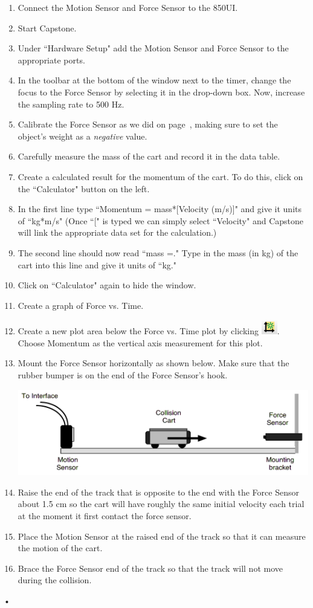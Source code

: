 \documentclass[main.tex]{subfiles}
\begin{document}
\begin{enumerate}
\item
Connect the Motion Sensor and Force Sensor to the 850UI.
\item
Start Capstone.
\item
Under ``Hardware Setup" add the Motion Sensor and Force Sensor to the appropriate ports.
\item
In the toolbar at the bottom of the window next to the timer, change the focus to the Force Sensor by selecting it in the drop-down box. Now, increase the sampling rate to 500 Hz.
\item
Calibrate the Force Sensor as we did on page~\pageref{page:Calibration}, making sure to set the object's weight as a \emph{negative} value.
\item
Carefully measure the mass of the cart and record it in the data table.
\item
Create a calculated result for the momentum of the cart. To do this, click on the ``Calculator" button on the left.
\item
In the first line type ``Momentum = mass*[Velocity (m/s)‎]" and give it units of ``kg*m/s" (Once ``[" is typed we can simply select ``Velocity" and Capstone will link the appropriate data set for the calculation.)
\item
The second line should now read ``mass =." Type in the mass (in kg) of the cart into this line and give it units of ``kg."
\item
Click on ``Calculator" again to hide the window.
\item
Create a graph of Force vs. Time.
\item
Create a new plot area below the Force vs. Time plot by clicking \includegraphics{Add_New_Plot}. Choose Momentum as the vertical axis measurement for this plot.
\item
Mount the Force Sensor horizontally as shown below. Make sure that the rubber bumper is on the end of the Force Sensor's hook.

\includegraphics[width=\textwidth]{Imp-Mom_1_Setup}

\item
Raise the end of the track that is opposite to the end with the Force Sensor about 1.5 cm so the cart will have roughly the same initial velocity each trial at the moment it first contact the force sensor.
\item
Place the Motion Sensor at the raised end of the track so that it can measure the motion of the cart.
\item
Brace the Force Sensor end of the track so that the track will not move during the collision.
\end{enumerate}•
\end{document}
